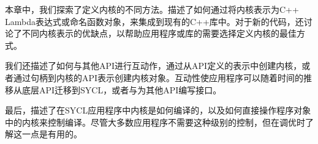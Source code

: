 
本章中，我们探索了定义内核的不同方法。描述了如何通过将内核表示为C++ Lambda表达式或命名函数对象，来集成到现有的C++库中。对于新的代码，还讨论了不同内核表示的优缺点，以帮助应用程序或库的需要选择定义内核的最佳方式。\par

我们还描述了如何与其他API进行互动作，通过从API定义的表示中创建内核，或者通过句柄到内核的API表示创建内核对象。互动性使应用程序可以随着时间的推移从底层API迁移到SYCL，或者与为其他API编写接口。\par

最后，描述了在SYCL应用程序中内核是如何编译的，以及如何直接操作程序对象中的内核来控制编译。尽管大多数应用程序不需要这种级别的控制，但在调优时了解这一点是有用的。\par


\newpage